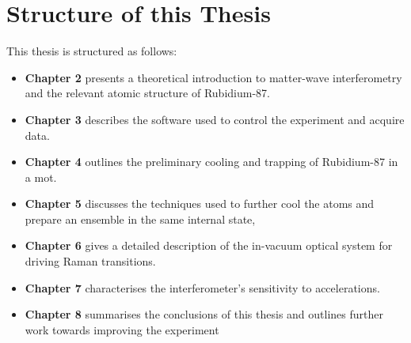 \section{Structure of this Thesis}
This thesis is structured as follows:
\begin{itemize}
  \item \textbf{Chapter 2} presents a theoretical introduction to
    matter-wave interferometry and the relevant atomic structure of
    Rubidium-87.
  \item \textbf{Chapter 3} describes the software used to control the
    experiment and acquire data.
  \item \textbf{Chapter 4} outlines the preliminary cooling and
    trapping of Rubidium-87 in a \ac{mot}.
  \item \textbf{Chapter 5} discusses the techniques used to further
    cool the atoms and prepare an ensemble in the same internal state,
  \item \textbf{Chapter 6} gives a detailed description of the
    in-vacuum optical system for driving Raman transitions.
  \item \textbf{Chapter 7} characterises the interferometer's
    sensitivity to accelerations.
  \item \textbf{Chapter 8} summarises the conclusions of this thesis and outlines
    further work towards improving the experiment
\end{itemize}



